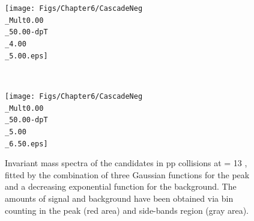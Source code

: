 \begin{landscape}
\begin{figure}[h]
\begin{minipage}[t]{.25\textwidth}
    \end{minipage}
    \hfill
    \begin{minipage}[t]{.25\textwidth}
		\hspace*{-2.5cm}
        \texttt{[image: Figs/Chapter6/CascadeNeg\\\_Mult0.00\\\_50.00-dpT\\\_4.00\\\_5.00.eps]}
    \end{minipage}  \\
    \begin{minipage}[t]{.25\textwidth}
        \hspace*{-2.5cm}
        \texttt{[image: Figs/Chapter6/CascadeNeg\\\_Mult0.00\\\_50.00-dpT\\\_5.00\\\_6.50.eps]}
    \end{minipage}
    \hfill
   	\caption{Invariant mass spectra of the \rmXiM candidates in pp collisions at \sqrtS = 13 \tev, fitted by the combination of three Gaussian functions for the peak and a decreasing exponential function for the background. The amounts of signal and background have been obtained via bin counting in the peak (red area) and side-bands region (gray area).}
	\label{fig:InvMassXiMinusVPt}
\end{figure}


\end{landscape}
